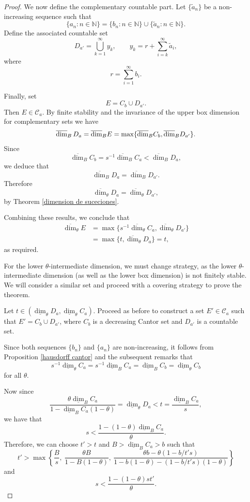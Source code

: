 \documentclass[10pt,a4paper]{amsart}
\newcommand\ubd{\overline{\mbox{\rm dim}}_{\rm B}\,} %
\begin{document}
\begin{proof}
We now define the complementary countable part. Let $\{\tilde{a}_n\}$ be a non-increasing sequence such that
\[
\{a_n : n \in \mathbb{N}\} = \{b_n : n \in \mathbb{N}\} \cup \{\tilde{a}_n : n \in \mathbb{N}\}.
\]
Define the associated countable set
\[
D_{a'} = \bigcup_{k=1}^{\infty} y_k, \qquad y_k = r + \sum_{i=k}^\infty \tilde{a}_i,
\]
where
\[
r = \sum_{i=1}^{\infty} b_i.
\]

Finally, set
\[
E = C_b \cup D_{a'}.
\]
Then \(E \in \mathcal{C}_a\). By finite stability and the invariance of the upper box dimension for complementary sets we have
\[
\ubd D_a =\overline{\dim}_B E = \max\{\overline{\dim}_B C_b, \overline{\dim}_B D_{a'}\}.
\]
Since
\[
\overline{\dim}_B C_b = s^{-1}\overline{\dim}_B C_a < \overline{\dim}_B D_a,
\]
we deduce that
\[
\overline{\dim}_B D_a = \overline{\dim}_B D_{a'}.
\]
Therefore
\[
\overline{\dim}_\theta D_a = \overline{\dim}_\theta D_{a'},
\]
by Theorem \ref{dimension de suceciones}.

Combining these results, we conclude that
\begin{align*}
\overline{\dim}_\theta E
&= \max\{s^{-1}\overline{\dim}_\theta C_a , \overline{\dim}_\theta D_{a'}\} \\
&= \max\{t, \overline{\dim}_\theta D_a\} = t,
\end{align*}
as required.


For the lower $\theta$-intermediate dimension, we must change strategy, as the lower $\theta$-intermediate dimension (as well as the lower box dimension) is not finitely stable. We will consider a similar set and proceed with a covering strategy to prove the theorem.

Let \( t \in (\underline{\dim}_\theta D_a, \underline{\dim}_\theta C_a) \). Proceed as before to construct a set \( E' \in \mathcal{C}_a \) such that \( E' = C_b \cup D_{a'} \), where $C_b$ is a decreasing Cantor set and \( D_{a'} \) is a countable set.

Since both sequences \( \{b_n\} \) and \( \{a_n\} \) are non-increasing, it follows from Proposition \ref{hausdorff cantor} and the subsequent remarks that \[ s^{-1}\underline{\dim}_\theta C_a = s^{-1}\underline{\dim}_B C_a = \underline{\dim}_B C_b = \underline{\dim}_\theta C_b  \] for all \( \theta \).

Now since  
\[
\frac{\theta \underline{\dim}_B C_a}{1 - \underline{\dim}_B C_a (1 - \theta)} = \underline{\dim}_\theta D_a < t = \frac{\underline{\dim}_B C_a}{s},
\]  
we have that  
\[
s < \frac{1 - (1 - \theta) \underline{\dim}_B C_a}{\theta}.
\]  
Therefore, we can choose \( t' > t \) and \( B > \underline{\dim}_B C_a > b \) such that  
\begin{equation}\label{condicion s}
t' > \max\left\{ \frac{B}{s},\ \frac{\theta B}{1 - B(1 - \theta)},\ \frac{\theta b - \theta(1 - b / t's)}{1 - b(1 - \theta) - (1 - b / t's)(1 - \theta)} \right\}
\end{equation}  
and  
\begin{equation}\label{condicion s 2}
s < \frac{1 - (1 - \theta) s t'}{\theta}.
\end{equation}


\end{proof}
\end{document}
